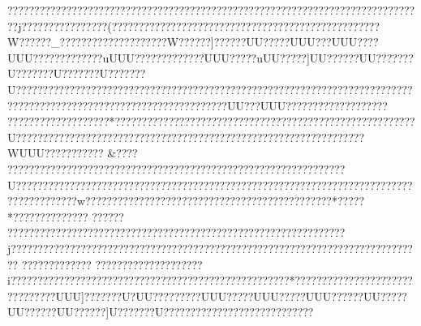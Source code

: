 {{{{{{{{{{{{{{{{{{{{{{{{{{{{{{{{{{{{{{{{{{{{{{{{{{{{{{{{{{{{{{{{{{{{{{{{{{{{{{{{{{{{{{{{{{{{{{{{{{{{{{{{{{{{{{{{{{{{{{{{{{{{{{{{{{{{{{{{{{{{{{{{{{{{{{{{{{{{{{{{{{{{{{{{{{{{{{{{{{{{{{{{{{{{{{{{{{{{{{{{{{{{{{{{{{{{{{{{{{{{{{{{{{{{{{{{{{{{{{{{{{{{{{{{{{{{{{{{{{{{{{{{{{{{{{{{{{{{{{{{{{{{{{{{{{{{{{{{{{{{{{{{{{{{{{{{{{{{{{{{{{{{{{{{{{{{{{{{{{{{{{{{{{{{{{{{{{{{{{{{{{{{{{{{{{{{{{{{{{{{{{{{{{{{{{{{{{{{{{{{{{{{{{{{{{{{{{{{{{{{{{{{{{{{{{{{{{{{{{{{{{{{{{{{{{{{{{{{{{{{{{{{{{{{{{{{{{{{{{{{{{{{{{{{{{{{{{{{{{{{{{{{{{{{{{{{{{{{{{{{{{{{{{{{{{{{{{{{{{{{{{{{{{{{{{{{{{{{{{{{{{{{{{{{{{{{{{{{{{{{{{{{{{{{{{{{{{{{{{{{{{{{{{{{{{{{{{{{{{{{{{{{{{{{{{{{{{{{{{{{{{{{{{{{{{{{{{{{{{{{{{{{{{{{{{{{{{{{{{{{{{{{{{{{{{{{{{{{{{{{{{{{{{{{{{{{{{{{{{{{{{{{{{{{{{{{{{{{{{{{{{{{{{{{{{{{{{{{{{{{{{{{{{{{{{{{{{{{{{{{{{{{{{{{{{{{{{??????????????????????????????????????????????????????????????????????????????j??????????? ?????(??????????????????????????????????????????????????W??????_????????????????????W??????]??????UU?????UUU???UUU????UUU?????    ????    ????uUUU????    ????    ?????UUU?????uUU?????]UU??????UU???????U???????U???????U???????U???????????????????????????????????????????????????????????????????????????????????????????   ?????   ?????  ?????   ?????   ????UU???UUU??    ??    ??   ????  ???? ?????  ???? ????? ????? ?????  *??? ????? ????????????????????????????????????????????????U????????????????    ?????????   ????????????????????????????????????    ????WUUU???? ??????? 
&????    ????????????  ???????????????????????????????????????????????????U??????????????????????????????????????????????????   ?????????????????????????????????????w??????????????????????????????????????????????*?????*?????????????? ?????? ???????????????????????????????????????????????????????????????j????????????????????????????????????????????????????????????????????????????? ????????????? ????????????????????i??????????????????????????? ????????????????????  ?????*????? ?????? ?????? ??????   ????   ????UUU]????    ???U?UU????    ?????UUU?????UUU?????UUU??????UU?????}UU??????UU??????]U???????U???????????????????????????? 
}}}}}}}}}}}}}}}}}}}}}}}}}}}}}}}}}}}}}}}}}}}}}}}}}}}}}}}}}}}}}}}}}}}}}}}}}}}}}}}}}}}}}}}}}}}}}}}}}}}}}}}}}}}}}}}}}}}}}}}}}}}}}}}}}}}}}}}}}}}}}}}}}}}}}}}}}}}}}}}}}}}}}}}}}}}}}}}}}}}}}}}}}}}}}}}}}}}}}}}}}}}}}}}}}}}}}}}}}}}}}}}}}}}}}}}}}}}}}}}}}}}}}}}}}}}}}}}}}}}}}}}}}}}}}}}}}}}}}}}}}}}}}}}}}}}}}}}}}}}}}}}}}}}}}}}}}}}}}}}}}}}}}}}}}}}}}}}}}}}}}}}}}}}}}}}}}}}}}}}}}}}}}}}}}}}}}}}}}}}}}}}}}}}}}}}}}}}}}}}}}}}}}}}}}}}}}}}}}}}}}}}}}}}}}}}}}}}}}}}}}}}}}}}}}}}}}}}}}}}}}}}}}}}}}}}}}}}}}}}}}}}}}}}}}}}}}}}}}}}}}}}}}}}}}}}}}}}}}}}}}}}}}}}}}}}}}}}}}}}}}}}}}}}}}}}}}}}}}}}}}}}}}}}}}}}}}}}}}}}}}}}}}}}}}}}}}}}}}}}}}}}}}}}}}}}}}}}}}}}}}}}}}}}}}}}}}}}}}}}}}}}}}}}}}}}}}}}}}}}}}}}}}}}}}}}}}}}}}}}}}}}}}}}}}}}}}}}}}}}}}}}}}}}}}}}}}}}}}}}}}}}}}}}}}}}}}}}}}}}}}}}}}}}}}}}}}}}}}}}}}}}}}}}}}}}}}}}}}}}}}}}}}}}}}}}}}
